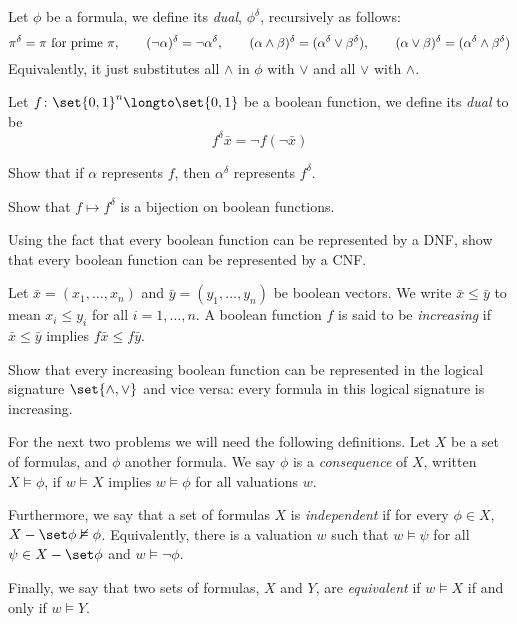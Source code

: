     Let $\phi$ be a formula, we define its {\it dual}, $\phi^\delta$, recursively as follows:
    $$ \pi^\delta = \pi \hbox{ for prime $\pi$},\qquad (\neg\alpha)^\delta=\neg\alpha^\delta,
    \qquad (\alpha\land\beta)^\delta = (\alpha^\delta\lor\beta^\delta),\qquad
    (\alpha\lor\beta)^\delta = (\alpha^\delta\land\beta^\delta) $$
    Equivalently, it just substitutes all $\land$ in $\phi$ with $\lor$ and all $\lor$ with
    $\land$.

    Let $f\colon\set{0,1}^n\longto\set{0,1}$ be a boolean function, we define its {\it dual} to be
    $$ f^\delta\bar x = \neg f(\neg\bar x) $$

    \benum
        \item Show that if $\alpha$ represents $f$, then $\alpha^\delta$ represents $f^\delta$.
        \item Show that $f\mapsto f^\delta$ is a bijection on boolean functions.
        \item Using the fact that every boolean function can be represented by a DNF, show that
        every boolean function can be represented by a CNF.
    \eenum

\eprob

\bprob

    Let $\bar x=(x_1,\dots,x_n)$ and $\bar y=(y_1,\dots,y_n)$ be boolean vectors.
    We write $\bar x\leq\bar y$ to mean $x_i\leq y_i$ for all $i=1,\dots,n$.
    A boolean function $f$ is said to be {\it increasing} if $\bar x\leq\bar y$ implies
    $f\bar x\leq f\bar y$.

    Show that every increasing boolean function can be represented in the logical signature
    $\set{{\land},{\lor}}$ and vice versa: every formula in this logical signature is increasing.

\eprob

For the next two problems we will need the following definitions.
Let $X$ be a set of formulas, and $\phi$ another formula.
We say $\phi$ is a {\it consequence} of $X$, written $X\vDash\phi$, if $w\vDash X$ implies
$w\vDash\phi$ for all valuations $w$.

Furthermore, we say that a set of formulas $X$ is {\it independent} if for every $\phi\in X$,
$X-\set\phi\nvDash\phi$.
Equivalently, there is a valuation $w$ such that $w\vDash\psi$ for all $\psi\in X-\set\phi$ and
$w\vDash\neg\phi$.

Finally, we say that two sets of formulas, $X$ and $Y$, are {\it equivalent} if $w\vDash X$ if
and only if $w\vDash Y$.

